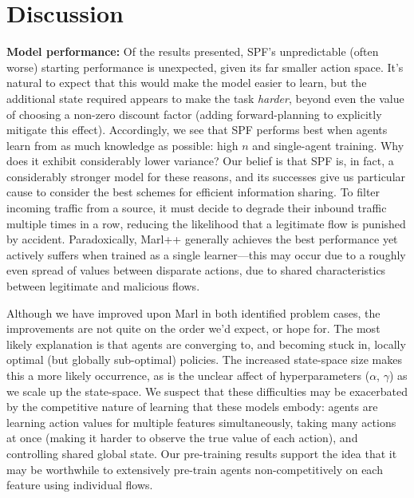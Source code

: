 \documentclass[conference, letterpaper, 10pt, times]{IEEEtran}
\newcommand{\fakepara}[1]{\noindent\textbf{#1:}}
\begin{document}
\section{Discussion}\label{sec:discussion}


\fakepara{Model performance}
Of the results presented, SPF's unpredictable (often worse) starting performance is unexpected, given its far smaller action space.
It's natural to expect that this would make the model easier to learn, but the additional state required appears to make the task \emph{harder}, beyond even the value of choosing a non-zero discount factor (adding forward-planning to explicitly mitigate this effect).
Accordingly, we see that SPF performs best when agents learn from as much knowledge as possible: high $n$ and single-agent training.
Why does it exhibit considerably lower variance?
Our belief is that SPF is, in fact, a considerably stronger model for these reasons, and its successes give us particular cause to consider the best schemes for efficient information sharing.
To filter incoming traffic from a source, it must decide to degrade their inbound traffic multiple times in a row, reducing the likelihood that a legitimate flow is punished by accident.
Paradoxically, Marl++ generally achieves the best performance yet actively suffers when trained as a single learner---this may occur due to a roughly even spread of values between disparate actions, due to shared characteristics between legitimate and malicious flows.

Although we have improved upon Marl in both identified problem cases, the improvements are not quite on the order we'd expect, or hope for.
The most likely explanation is that agents are converging to, and becoming stuck in, locally optimal (but globally sub-optimal) policies.
The increased state-space size makes this a more likely occurrence, as is the unclear affect of hyperparameters ($\alpha$, $\gamma$) as we scale up the state-space.
We suspect that these difficulties may be exacerbated by the competitive nature of learning that these models embody: agents are learning action values for multiple features simultaneously, taking many actions at once (making it harder to observe the true value of each action), and controlling shared global state.
Our pre-training results support the idea that it may be worthwhile to extensively pre-train agents non-competitively on each feature using individual flows.
\end{document}
